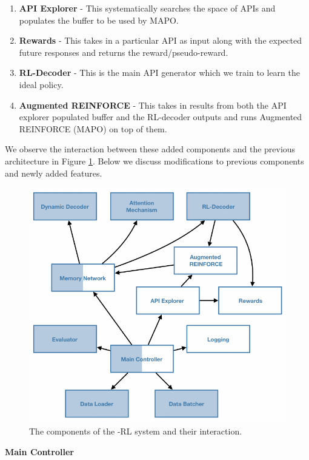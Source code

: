 \begin{enumerate}
	\item \textbf{API Explorer} - This systematically searches the space of APIs and populates the buffer to be used by MAPO.
	\item \textbf{Rewards} - This takes in a particular API as input along with the expected future responses and returns the reward/pseudo-reward.
	\item \textbf{RL-Decoder} - This is the main API generator which we train to learn the ideal policy.
	\item \textbf{Augmented REINFORCE} - This takes in results from both the API explorer populated buffer and the RL-decoder outputs and runs Augmented REINFORCE (MAPO) on top of them.
\end{enumerate}

We observe the interaction between these added components and the previous architecture in Figure \ref{fig:sys_comp_rl}. Below we discuss modifications to previous components and newly added features.

\begin{figure}[t]
\centering
\includegraphics[scale=1.2]{assets/figures/rl_components.pdf}
\caption{The components of the \sys -RL system and their interaction.}
\label{fig:sys_comp_rl}
\end{figure}

\noindent\textbf{Main Controller}

